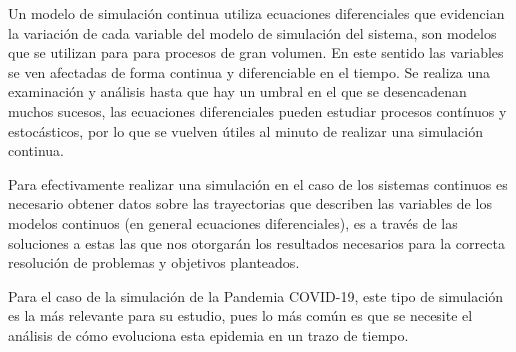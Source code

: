Un modelo de simulación continua utiliza ecuaciones diferenciales que evidencian la variación de cada variable del modelo de simulación del sistema, son modelos que se utilizan para para procesos de gran volumen. En este sentido las variables se ven afectadas de forma continua y diferenciable en el tiempo. Se realiza una examinación y análisis hasta que hay un umbral en el que se desencadenan muchos sucesos, las ecuaciones diferenciales pueden estudiar procesos contínuos y estocásticos, por lo que se vuelven útiles al minuto de realizar una simulación continua.

Para efectivamente realizar una simulación en el caso de los sistemas continuos es necesario obtener datos sobre las trayectorias que describen las variables de los modelos continuos (en general ecuaciones diferenciales), es a través de las soluciones a estas las que nos otorgarán los resultados necesarios para la correcta resolución de problemas y objetivos planteados.

Para el caso de la simulación de la Pandemia COVID-19, este tipo de simulación es la más relevante para su estudio, pues lo más común es que se necesite el análisis de cómo evoluciona esta epidemia en un trazo de tiempo.
